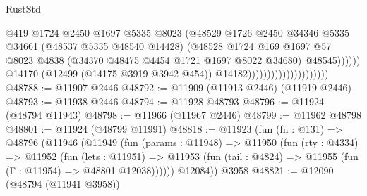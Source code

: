 \begin{lexlean}{RustStd}
\begin{coremodule}
                                                      @419
                                                      @1724
                                                      @2450
                                                      @1697
                                                      @5335
                                                      @8023
                                                      (@48529
                                                        @1726
                                                        @2450
                                                        @34346
                                                        @5335
                                                        @34661
                                                        (@48537 @5335 @48540 @14428)
                                                        (@48528
                                                          @1724
                                                          @169
                                                          @1697
                                                          @57
                                                          @8023
                                                          @4838
                                                          (@34370
                                                            @48475
                                                            @4454
                                                            @1721
                                                            @1697
                                                            @8022
                                                            @34680)
                                                          @48545))))))
                                              @14170
                                              (@12499 (@14175 @3919 @3942 @454))
                                              @14182)))))))))))))))))))))
@48788 := @11907 @2446
@48792 := @11909 (@11913 @2446) (@11919 @2446)
@48793 := @11938 @2446
@48794 := @11928 @48793
@48796 := @11924 (@48794 @11943)
@48798 := @11966 (@11967 @2446)
@48799 := @11962 @48798
@48801 := @11924 (@48799 @11991)
@48818 := @11923
    (fun (fn : @131) =>
    @48796
      (@11946
        (@11949
          (fun (params : @11948) =>
          @11950
            (fun (rty : @4334) =>
            @11952
              (fun (lets : @11951) =>
              @11953 (fun (tail : @4824) => @11955 (fun (Γ : @11954) => @48801 @12038))))))
        @12084))
    @3958
@48821 := @12090 (@48794 (@11941 @3958))

\end{coremodule}
\end{lexlean}
